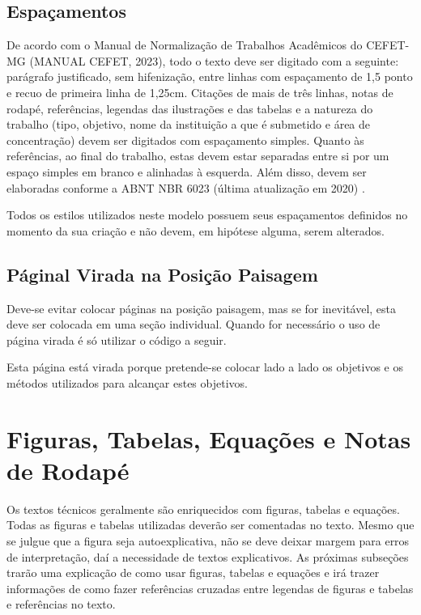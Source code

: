 \documentclass[
        oneside,      %
        english,			
        brazil			 
        ]{configcefetmglpd}
\begin{document}
\section{Espaçamentos}

De acordo com o Manual de Normalização de Trabalhos Acadêmicos do CEFET-MG (MANUAL CEFET, 2023), todo o texto deve ser 
digitado com a seguinte: parágrafo justificado, sem hifenização, entre linhas com espaçamento de 1,5 ponto e recuo de primeira 
linha de 1,25cm. Citações de mais de três linhas, notas de rodapé, referências, legendas das ilustrações e 
das tabelas e a natureza do trabalho (tipo, objetivo, nome da instituição a que é submetido e área de concentração) devem ser 
digitados com espaçamento simples. Quanto às referências, ao final do trabalho, estas devem estar separadas entre si por um espaço 
simples em branco e alinhadas à esquerda. Além disso, devem ser elaboradas conforme a ABNT NBR 6023 (última atualização em 2020) 
\cite{bib:abnt6023}.

Todos os estilos utilizados neste modelo possuem seus espaçamentos definidos no momento da sua criação e não devem, 
em hipótese alguma, serem alterados.

\section{Páginal Virada na Posição Paisagem} 
Deve-se evitar colocar páginas na posição paisagem, mas se for inevitável, esta deve ser colocada em uma seção individual. Quando for necessário o uso de página virada é só utilizar o código a seguir.

\begin{landscape}
Esta página está virada porque pretende-se colocar lado a lado os objetivos e os métodos utilizados para alcançar estes objetivos.
\end{landscape}

\chapter{Figuras, Tabelas, Equações e Notas de Rodapé} \label{cap:fig_tab_eq}
Os textos técnicos geralmente são enriquecidos com figuras, tabelas e equações. Todas as figuras e tabelas utilizadas deverão ser comentadas no texto. Mesmo que se julgue que a figura seja autoexplicativa, não se deve deixar margem para erros de interpretação, daí a necessidade de textos explicativos. As próximas subseções trarão uma explicação de como usar figuras, tabelas e equações e irá trazer informações de como fazer referências cruzadas entre legendas de figuras e tabelas e referências no texto.
\end{document}
